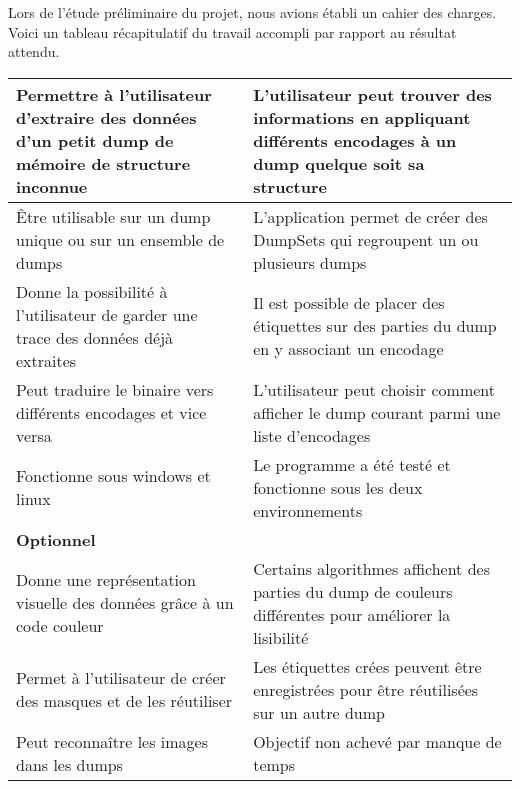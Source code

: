 Lors de l’étude préliminaire du projet, nous avions établi un cahier des charges. Voici un tableau récapitulatif du travail accompli par rapport au résultat attendu.


\begin{tabular}{|p{6cm}|p{6cm}|}
  \hline
  Permettre à l’utilisateur d’extraire des données d’un petit dump de mémoire de structure inconnue &
  L'utilisateur peut trouver des informations en appliquant différents encodages à un dump quelque soit sa structure
  \\ \hline
  Être utilisable sur un dump unique ou sur un ensemble de dumps &
  L'application permet de créer des DumpSets qui regroupent un ou plusieurs dumps
  \\ \hline
  Donne la possibilité à l’utilisateur de garder une trace des données déjà extraites &
  Il est possible de placer des étiquettes sur des parties du dump en y associant un encodage
  \\ \hline
  Peut traduire le binaire vers différents encodages et vice versa &
  L'utilisateur peut choisir comment afficher le dump courant parmi une liste d'encodages
  \\ \hline
  Fonctionne sous windows et linux &
  Le programme a été testé et fonctionne sous les deux environnements
  \\ \hline \hline
  \textbf{Optionnel} &
  \\ \hline
  Donne une représentation visuelle des données grâce à un code couleur &
  Certains algorithmes affichent des parties du dump de couleurs différentes pour améliorer la lisibilité
  \\ \hline
  Permet à l’utilisateur de créer des masques et de les réutiliser &
  Les étiquettes crées peuvent être enregistrées pour être réutilisées sur un autre dump
  \\ \hline
  Peut reconnaître les images dans les dumps &
  Objectif non achevé par manque de temps
  \\ \hline
\end{tabular}
